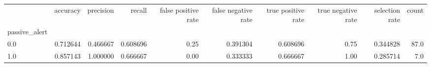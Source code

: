\begin{tabular}{lrrrrrrrrr}
\toprule
{} &  accuracy &  precision &    recall &  false positive rate &  false negative rate &  true positive rate &  true negative rate &  selection rate &  count \\
passive\_alert &           &            &           &                      &                      &                     &                     &                 &        \\
\midrule
0.0           &  0.712644 &   0.466667 &  0.608696 &                 0.25 &             0.391304 &            0.608696 &                0.75 &        0.344828 &   87.0 \\
1.0           &  0.857143 &   1.000000 &  0.666667 &                 0.00 &             0.333333 &            0.666667 &                1.00 &        0.285714 &    7.0 \\
\bottomrule
\end{tabular}
